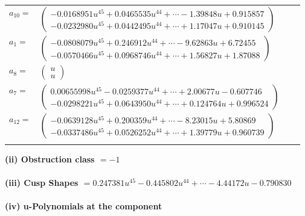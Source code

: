 \documentclass[1p]{elsarticle_modified}
\theoremstyle{definition}
\begin{document}
\begin{tabular}{m{7pt} m{180pt} m{7pt} m{180pt} }
\flushright $a_{10}=$&$\begin{pmatrix}-0.0168951 u^{45}+0.0465535 u^{44}+\cdots-1.39848 u+0.915857\\-0.0232980 u^{45}+0.0442495 u^{44}+\cdots+1.17047 u+0.910145\end{pmatrix}$ \\
\flushright $a_{1}=$&$\begin{pmatrix}-0.0808079 u^{45}+0.246912 u^{44}+\cdots-9.62863 u+6.72455\\-0.0570466 u^{45}+0.0968746 u^{44}+\cdots+1.56827 u+1.87088\end{pmatrix}$ \\
\flushright $a_{8}=$&$\begin{pmatrix}u\\u\end{pmatrix}$ \\
\flushright $a_{7}=$&$\begin{pmatrix}0.00655998 u^{45}-0.0259377 u^{44}+\cdots+2.00677 u-0.607746\\-0.0298221 u^{45}+0.0643950 u^{44}+\cdots+0.124764 u+0.996524\end{pmatrix}$ \\
\flushright $a_{12}=$&$\begin{pmatrix}-0.0639128 u^{45}+0.200359 u^{44}+\cdots-8.23015 u+5.80869\\-0.0337486 u^{45}+0.0526252 u^{44}+\cdots+1.39779 u+0.960739\end{pmatrix}$\\&\end{tabular}
\flushleft \textbf{(ii) Obstruction class $= -1$}\\~\\
\flushleft \textbf{(iii) Cusp Shapes $= 0.247381 u^{45}-0.445802 u^{44}+\cdots-4.44172 u-0.790830$}\\~\\
\newpage\renewcommand{\arraystretch}{1}
\flushleft \textbf{(iv) u-Polynomials at the component}\newline \\
\end{document}
